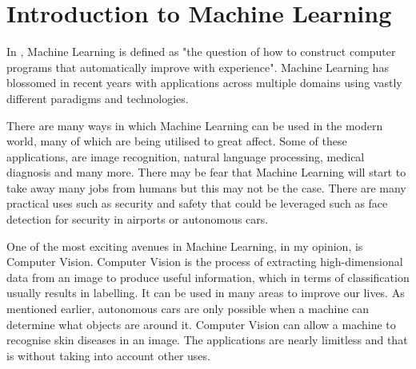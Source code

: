 \section{Introduction to Machine Learning}
In \textcite{MLANN}, Machine Learning is defined as "the question of how to
construct computer programs that automatically improve with experience".
Machine Learning has blossomed in recent years with applications across multiple
domains using vastly different paradigms and technologies.

There are many ways in which Machine Learning can be used in the modern world,
many of which are being utilised to great affect.
Some of these applications, are image recognition, natural language
processing,
medical diagnosis and many more.
There may be fear that Machine Learning will start to take away many jobs
from
humans but this may not be the case. There are many practical uses such as security and safety that could be leveraged such as face detection for security in airports or autonomous cars.

One of the most exciting avenues in Machine Learning, in my opinion, is
Computer
Vision. Computer Vision is the process of extracting high-dimensional data from an image to produce useful information, which in terms of classification usually results in labelling. It can be used in many areas to improve our lives. As
mentioned earlier, autonomous cars are only possible when a machine can
determine what objects are around it. Computer Vision can allow a machine to
recognise skin diseases in an image. The applications are nearly limitless
and
that is without taking into account other uses.

